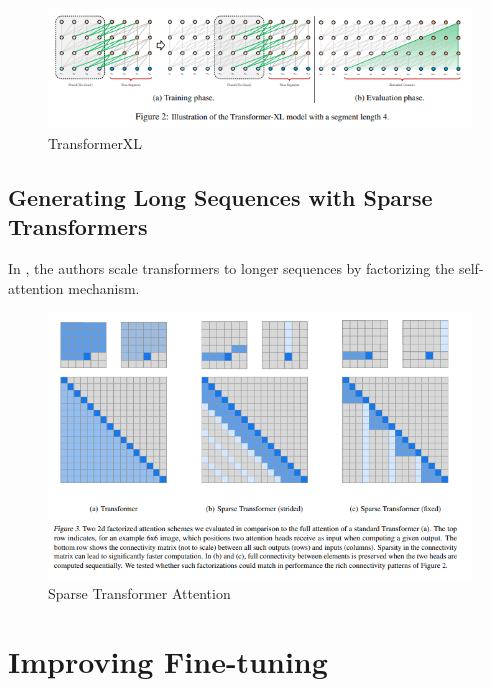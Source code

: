 \documentclass[11pt]{article}
\theoremstyle{definition}
\begin{document}
\begin{figure}
\centering
  \includegraphics[width=\textwidth,height=\textheight,keepaspectratio]{transformers/transformerXL_model.png}
  \caption{TransformerXL \cite{dai2019transformerxl}}
  \label{fig:transformerxl}
\end{figure}


\subsection{Generating Long Sequences with Sparse Transformers}

In \cite{child2019generating}, the authors scale transformers to longer sequences by factorizing the self-attention mechanism.

\begin{figure}
\centering
  \includegraphics[width=\textwidth,height=\textheight,keepaspectratio]{transformers/sparse_transformer_attention.png}
  \caption{Sparse Transformer Attention \cite{child2019generating}}
  \label{fig:sparse_transformer_attention}
\end{figure}

\section{Improving Fine-tuning}
\end{document}
